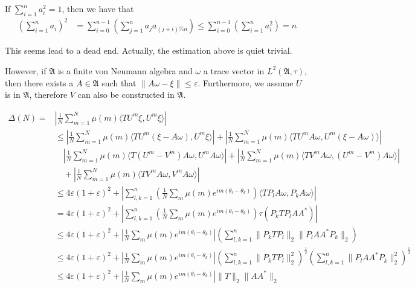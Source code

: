 \documentclass[a4paper,10pt]{amsart}
\newcommand{\AAA}{\mathfrak A}
\begin{document}
If $\sum_{i=1}^{n} a_{i}^{2} = 1$, then we have that
\begin{align*}
    \left (\sum_{i=1}^{n}a_i \right)^{2} &= \sum_{i = 0}^{n-1} \left 
    (\sum_{j=1}^{n} a_{j}a_{(j + i)\%n} \right )
     \leq \sum_{i = 0}^{n-1} \left (\sum_{i=1}^{n} a_{i}^{2} \right) = n 
\end{align*}

This seems lead to a dead end. Actually, the estimation above is 
quiet trivial.

However, if $\AAA$ is a finite von Neumann algebra and 
$\omega$ a trace vector in 
$L^{2}(\AAA, \tau)$, then there exists a $A \in \AAA$ such that
$ \| A\omega - \xi \| \leq \varepsilon$. Furthermore, we assume
$U$ is in $\AAA$, therefore $V$ can also be constructed in $\AAA$.

\begin{align*}
    \Delta(N) = 
  &| \frac{1}{N}\sum_{m=1}^{N}\mu(m)\langle TU^{m}\xi, U^{m}\xi \rangle | \\
  & \leq 
    | \frac{1}{N}\sum_{m=1}^{N}\mu(m)\langle TU^{m}
    (\xi - A\omega), U^{m}\xi \rangle | 
    + | \frac{1}{N}\sum_{m=1}^{N}\mu(m)\langle TU^{m}
    A\omega, U^{m}(\xi - A\omega) \rangle |\\ 
    & \quad | \frac{1}{N}\sum_{m=1}^{N}\mu(m)\langle T(U^{m} - V^{m})A\omega
    , U^{m}A\omega \rangle|
    + | \frac{1}{N}\sum_{m=1}^{N}\mu(m)\langle TV^{m}A\omega, 
    (U^{m}-V^{m})A\omega \rangle| \\ 
  & \quad + | \frac{1}{N}\sum_{m=1}^{N}\mu(m)\langle TV^{m}A\omega,
    V^{m}A\omega \rangle | \\
    & \leq 4\varepsilon(1+\varepsilon)^2 
    + | \sum_{l,k=1}^{n} (\frac{1}{N}\sum_{m}\mu(m)e^{im(\theta_l 
    - \theta_k)})\langle TP_{l}A\omega, P_{k}A\omega \rangle|\\
    & = 4\varepsilon(1+\varepsilon)^2 
    + |\sum_{l,k=1}^{n} (\frac{1}{N}\sum_{m}\mu(m)e^{im(\theta_l 
    - \theta_k)})\tau(P_{k}TP_{l}AA^{*})|\\
    & \leq 4\varepsilon(1+\varepsilon)^2 + 
    |\frac{1}{N}\sum_{m}\mu(m)e^{im(\theta_l 
    - \theta_k)}|
    (\sum_{l,k=1}^{n} \|P_{k}TP_{l}\|_2 \|P_{l}AA^{*}P_{k}\|_2)\\ 
    & \leq 4\varepsilon(1+\varepsilon)^2 + 
    |\frac{1}{N}\sum_{m}\mu(m)e^{im(\theta_l 
    - \theta_k)}|
    (\sum_{l,k=1}^{n} \|P_{k}TP_{l}\|_{2}^{2})^{\frac{1}{2}}
    (\sum_{l,k=1}^{n} \|P_{l}AA^{*}P_{k}\|_{2}^{2})^{\frac{1}{2}}\\
    & \leq 4\varepsilon(1+\varepsilon)^2 + 
    |\frac{1}{N}\sum_{m}\mu(m)e^{im(\theta_l 
    - \theta_k)}| \|T\|_2 \|AA^{*}\|_2
\end{align*}
\end{document}
